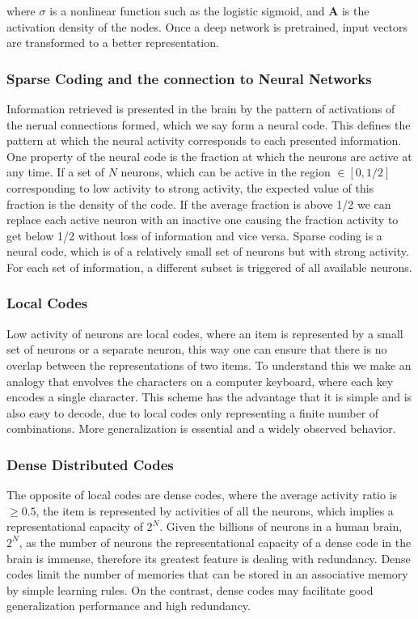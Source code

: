 where $\sigma$ is a nonlinear function such as the logistic sigmoid, and $\mathbf{A}$ is the activation density of the nodes. Once a deep network is pretrained, input vectors are transformed to a better representation. \cite{autoencoder2}

\subsubsection{Sparse Coding and the connection to Neural Networks}
\label{sec:scnn}

Information retrieved is presented in the brain by the pattern of activations of the nerual connections formed, which we say form a neural code. This defines the pattern at which the neural activity corresponds to each presented information. 
One property of the neural code is the fraction at which the neurons are active at any time. If a set of $N$ neurons, which can be active in the region $\in [0,1/2]$ corresponding to low activity to strong activity, the expected value of this fraction is the density of the code. If the average fraction is above 1/2 we can replace each active neuron with an inactive one causing the fraction activity to get below 1/2 without loss of information and vice versa. Sparse coding is a neural code, which is of a relatively small set of neurons but with strong activity. For each set of information, a different subset is triggered of all available neurons.\cite{scprimate}

\subsubsection{Local Codes}
Low activity of neurons are local codes, where an item is represented by a small set of neurons or a separate neuron, this way one can ensure that there is no overlap between the representations of two items. To understand this we make an analogy that envolves the characters on a computer keyboard, where each key encodes a single character. This scheme has the advantage that it is simple and is also easy to decode, due to local codes only representing a finite number of combinations. More generalization is essential and a widely observed behavior. \cite{mclaren}

\subsubsection{Dense Distributed Codes}

The opposite of local codes are dense codes, where the average activity ratio is $\geq 0.5$, the item is represented by activities of all the neurons, which implies a representational capacity of $2^N$. Given the billions of neurons in a human brain, $2^N$, as the number of neurons the representational capacity of a dense code in the brain is immense, therefore its greatest feature is dealing with redundancy. Dense codes limit the number of memories that can be stored in an associative memory by simple learning rules. On the contrast, dense codes may facilitate good generalization performance and high redundancy.

